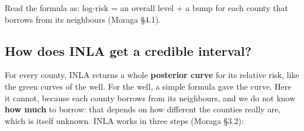 \documentclass[
  letterpaper,
  DIV=11,
  numbers=noendperiod]{scrartcl}
\newenvironment{Shaded}{\begin{snugshade}}{\end{snugshade}}
\newcommand{\AttributeTok}[1]{\textcolor[rgb]{0.40,0.45,0.13}{#1}}
\newcommand{\CommentTok}[1]{\textcolor[rgb]{0.37,0.37,0.37}{#1}}
\newcommand{\ConstantTok}[1]{\textcolor[rgb]{0.56,0.35,0.01}{#1}}
\newcommand{\DecValTok}[1]{\textcolor[rgb]{0.68,0.00,0.00}{#1}}
\newcommand{\FunctionTok}[1]{\textcolor[rgb]{0.28,0.35,0.67}{#1}}
\newcommand{\NormalTok}[1]{\textcolor[rgb]{0.00,0.23,0.31}{#1}}
\newcommand{\OtherTok}[1]{\textcolor[rgb]{0.00,0.23,0.31}{#1}}
\newcommand{\SpecialCharTok}[1]{\textcolor[rgb]{0.37,0.37,0.37}{#1}}
\newcommand{\StringTok}[1]{\textcolor[rgb]{0.13,0.47,0.30}{#1}}
\begin{document}
\begin{Shaded}
\end{Shaded}

Read the formula as: log-risk = an overall level + a bump for each
county that borrows from its neighbours (Moraga §4.1).

\subsection{How does INLA get a credible
interval?}\label{how-does-inla-get-a-credible-interval}

For every county, INLA returns a whole \textbf{posterior curve} for its
relative risk, like the green curves of the well. For the well, a simple
formula gave the curve. Here it cannot, because each county borrows from
its neighbours, and we do not know \textbf{how much} to borrow: that
depends on how different the counties really are, which is itself
unknown. INLA works in three steps (Moraga §3.2):
\end{document}
